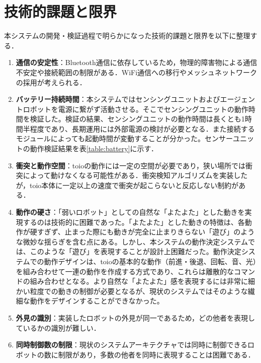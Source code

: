 \documentclass{cuxarticle}
\begin{document}
\section{技術的課題と限界}
本システムの開発・検証過程で明らかになった技術的課題と限界を以下に整理する．

\begin{enumerate}
  \item \textbf{通信の安定性}：Bluetooth通信に依存しているため，物理的障害物による通信不安定や接続範囲の制限がある．WiFi通信への移行やメッシュネットワークの採用が考えられる．

  \item \textbf{バッテリー持続時間}：本システムではセンシングユニットおよびエージェントロボットを電源に繋がず活動させる。そこでセンシングユニットの動作時間を検証した。検証の結果、センシングユニットの動作時間は長くとも1時間半程度であり、長期運用には外部電源の検討が必要となる．また接続するモジュールによっても起動時間が変動することが分かった。センサーユニットの動作検証結果を表\ref{table:battery}に示す．

  \item \textbf{衝突と動作空間}：toioの動作には一定の空間が必要であり，狭い場所では衝突によって動けなくなる可能性がある．衝突検知アルゴリズムを実装したが，toio本体に一定以上の速度で衝突が起こらないと反応しない制約がある．

  \item \textbf{動作の硬さ}：「弱いロボット」としての自然な「よたよた」とした動きを実現するのは技術的に困難であった。「よたよた」とした動きの特徴は、各動作が硬すぎず、止まった際にも動きが完全に止まりきらない「遊び」のような微妙な揺らぎを含む点にある。しかし、本システムの動作決定システムでは、このような「遊び」を表現することが設計上困難だった。動作決定システムでの動作デザインは、toioの基本的な動作（前進・後退、回転、音、光）を組み合わせて一連の動作を作成する方式であり、これらは離散的なコマンドの組み合わせとなる。より自然な「よたよた」感を表現するには非常に細かい粒度での動きの制御が必要となるが、現状のシステムではそのような繊細な動作をデザインすることができなかった。

  \item \textbf{外見の識別}：実装したロボットの外見が同一であるため，どの他者を表現しているかの識別が難しい．

  \item \textbf{同時制御数の制限}：現状のシステムアーキテクチャでは同時に制御できるロボットの数に制限があり，多数の他者を同時に表現することは困難である．
\end{enumerate}
\end{document}
